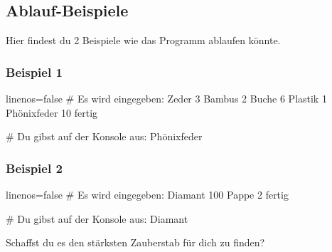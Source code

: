 \documentclass{\VorlagenPfad/coderdojokatext}
\begin{document}
\subsection{Ablauf-Beispiele}
Hier findest du 2 Beispiele wie das Programm ablaufen könnte. 
\subsubsection{Beispiel 1}
\begin{pseudocode*}{linenos=false}
# Es wird eingegeben:
Zeder
3
Bambus
2 
Buche 
6 
Plastik 
1 
Phönixfeder 
10 
fertig

# Du gibst auf der Konsole aus: 
Phönixfeder

\end{pseudocode*}

\subsubsection{Beispiel 2}

\begin{pseudocode*}{linenos=false}
# Es wird eingegeben:
Diamant
100
Pappe
2
fertig

# Du gibst auf der Konsole aus:
Diamant
\end{pseudocode*}

Schaffst du es den stärksten Zauberstab für dich zu finden?
	
\end{document}

